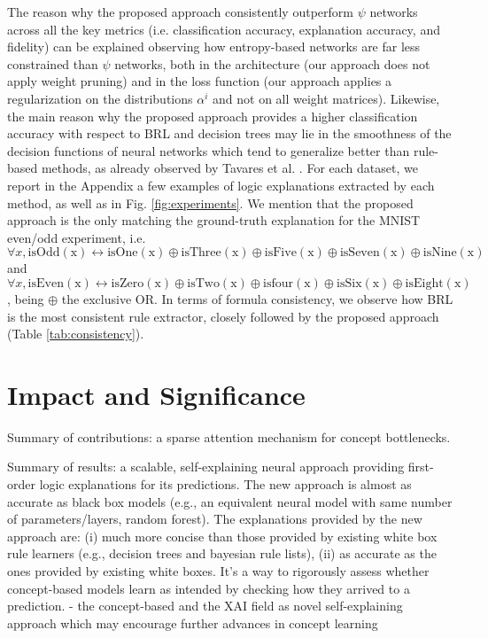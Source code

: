 The reason why the proposed approach consistently outperform $\psi$ networks across all the key metrics (i.e. classification accuracy, explanation accuracy, and fidelity) can be explained observing how entropy-based networks are far less constrained than $\psi$ networks, both in the architecture (our approach does not apply weight pruning) and in the loss function (our approach applies a regularization on the distributions $\alpha^i$ and not on all weight matrices). Likewise, the main reason why the proposed approach provides a higher classification accuracy with respect to BRL and decision trees may lie in the smoothness of the decision functions of neural networks which tend to generalize better than rule-based methods, as already observed by Tavares et al. \citep{tavares2020understanding}.
For each dataset, we report in the Appendix a few examples of logic explanations extracted by each method, as well as in Fig. \ref{fig:experiments}. We mention that the proposed approach is the only matching the %
ground-truth explanation for the MNIST even/odd experiment, i.e. $\forall x, \mathrm{isOdd(x)} \leftrightarrow \mathrm{isOne(x)} \oplus \mathrm{isThree(x)} \oplus \mathrm{isFive(x)} \oplus \mathrm{isSeven(x)} \oplus \mathrm{isNine(x)}$ and $\forall x, \mathrm{isEven(x)} \leftrightarrow \mathrm{isZero(x)} \oplus \mathrm{isTwo(x)} \oplus \mathrm{isfour(x)} \oplus \mathrm{isSix(x)} \oplus \mathrm{isEight(x)}$, being $\oplus$ the exclusive OR.
In terms of formula consistency, we observe how 
BRL is the most consistent rule extractor, closely followed by the proposed approach (Table \ref{tab:consistency}).

\section{Impact and Significance}
Summary of contributions: a sparse attention mechanism for concept bottlenecks.

Summary of results: a scalable, self-explaining neural approach providing first-order logic explanations for its predictions. The new approach is almost as accurate as black box models (e.g., an equivalent neural model with same number of parameters/layers, random forest). The explanations provided by the new approach are: (i) much more concise than those provided by existing white box rule learners (e.g., decision trees and bayesian rule lists), (ii) as accurate as the ones provided by existing white boxes. It's a way to rigorously assess whether concept-based models learn as intended by checking how they arrived to a prediction.
- the concept-based and the XAI field as novel self-explaining approach which may encourage further advances in concept learning

